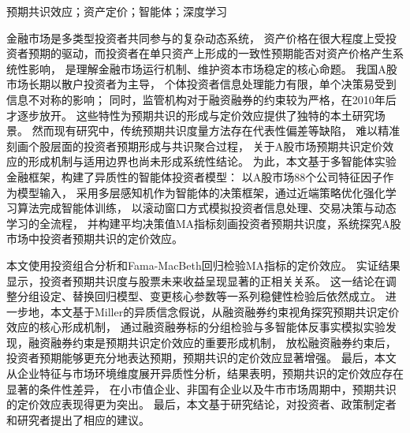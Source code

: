 {}

\begin{cnabstract}{预期共识效应；资产定价；智能体；深度学习}

金融市场是多类型投资者共同参与的复杂动态系统，
资产价格在很大程度上受投资者预期的驱动，而投资者在单只资产上形成的一致性预期能否对资产价格产生系统性影响，
是理解金融市场运行机制、维护资本市场稳定的核心命题。
我国A股市场长期以散户投资者为主导，
个体投资者信息处理能力有限，单个决策易受到信息不对称的影响；
同时，监管机构对于融资融券的约束较为严格，在2010年后才逐步放开。
这些特性为预期共识的形成与定价效应提供了独特的本土研究场景。
然而现有研究中，传统预期共识度量方法存在代表性偏差等缺陷，
难以精准刻画个股层面的投资者预期形成与共识聚合过程，
关于A股市场预期共识定价效应的形成机制与适用边界也尚未形成系统性结论。
为此，本文基于多智能体实验金融框架，构建了异质性的智能体投资者模型：
以A股市场88个公司特征因子作为模型输入，
采用多层感知机作为智能体的决策框架，通过近端策略优化强化学习算法完成智能体训练，
以滚动窗口方式模拟投资者信息处理、交易决策与动态学习的全流程，
并构建平均决策值MA指标刻画投资者预期共识度，系统探究A股市场中投资者预期共识的定价效应。

本文使用投资组合分析和Fama-MacBeth回归检验MA指标的定价效应。
实证结果显示，投资者预期共识度与股票未来收益呈现显著的正相关关系。
这一结论在调整分组设定、替换回归模型、变更核心参数等一系列稳健性检验后依然成立。
进一步地，本文基于Miller的异质信念假说，从融资融券约束视角探究预期共识定价效应的核心形成机制，
通过融资融券标的分组检验与多智能体反事实模拟实验发现，融资融券约束是预期共识定价效应的重要形成机制，
放松融资融券约束后，投资者预期能够更充分地表达预期，预期共识的定价效应显著增强。
最后，本文从企业特征与市场环境维度展开异质性分析，结果表明，预期共识的定价效应存在显著的条件性差异，
在小市值企业、非国有企业以及牛市市场周期中，预期共识的定价效应表现得更为突出。
最后，本文基于研究结论，对投资者、政策制定者和研究者提出了相应的建议。

  
\end{cnabstract}
\newpage

{}

